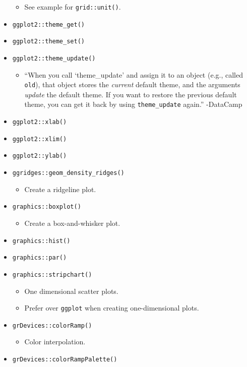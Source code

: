 \documentclass[
]{book}
\providecommand{\tightlist}{%
  \setlength{\itemsep}{0pt}\setlength{\parskip}{0pt}}
\begin{document}
\begin{itemize}
  \begin{itemize}
  \tightlist
  \item
    See example for \texttt{grid::unit()}.
  \end{itemize}
\item
  \texttt{ggplot2::theme\_get()}
\item
  \texttt{ggplot2::theme\_set()}
\item
  \texttt{ggplot2::theme\_update()}

  \begin{itemize}
  \tightlist
  \item
    ``When you call `theme\_update' and assign it to an object (e.g., called \texttt{old}), that object stores the \emph{current} default theme, and the arguments \emph{update} the default theme. If you want to restore the previous default theme, you can get it back by using \texttt{theme\_update} again.'' -DataCamp
  \end{itemize}
\item
  \texttt{ggplot2::xlab()}
\item
  \texttt{ggplot2::xlim()}
\item
  \texttt{ggplot2::ylab()}
\item
  \texttt{ggridges::geom\_density\_ridges()}

  \begin{itemize}
  \tightlist
  \item
    Create a ridgeline plot.
  \end{itemize}
\item
  \texttt{graphics::boxplot()}

  \begin{itemize}
  \tightlist
  \item
    Create a box-and-whisker plot.
  \end{itemize}
\item
  \texttt{graphics::hist()}
\item
  \texttt{graphics::par()}
\item
  \texttt{graphics::stripchart()}

  \begin{itemize}
  \tightlist
  \item
    One dimensional scatter plots.
  \item
    Prefer over \texttt{ggplot} when creating one-dimensional plots.
  \end{itemize}
\item
  \texttt{grDevices::colorRamp()}

  \begin{itemize}
  \tightlist
  \item
    Color interpolation.
  \end{itemize}
\item
  \texttt{grDevices::colorRampPalette()}


\end{itemize}
\end{document}
